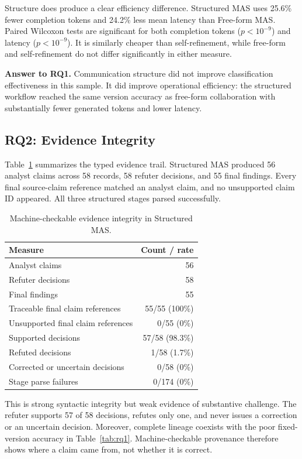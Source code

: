 Structure does produce a clear efficiency difference. Structured MAS uses 25.6\% fewer completion tokens and 24.2\% less mean latency than Free-form MAS. Paired Wilcoxon tests are significant for both completion tokens ($p<10^{-9}$) and latency ($p<10^{-9}$). It is similarly cheaper than self-refinement, while free-form and self-refinement do not differ significantly in either measure.

\noindent\textbf{Answer to RQ1.} Communication structure did not improve classification effectiveness in this sample. It did improve operational efficiency: the structured workflow reached the same version accuracy as free-form collaboration with substantially fewer generated tokens and lower latency.

\subsection{RQ2: Evidence Integrity}

Table~\ref{tab:rq2} summarizes the typed evidence trail. Structured MAS produced 56 analyst claims across 58 records, 58 refuter decisions, and 55 final findings. Every final source-claim reference matched an analyst claim, and no unsupported claim ID appeared. All three structured stages parsed successfully.

\begin{table}[t]
\centering
\caption{Machine-checkable evidence integrity in Structured MAS.}
\label{tab:rq2}
\setlength{\tabcolsep}{4pt}
\begin{tabular}{lr}
\toprule
Measure & Count / rate \\
\midrule
Analyst claims & 56 \\
Refuter decisions & 58 \\
Final findings & 55 \\
Traceable final claim references & 55/55 (100\%) \\
Unsupported final claim references & 0/55 (0\%) \\
Supported decisions & 57/58 (98.3\%) \\
Refuted decisions & 1/58 (1.7\%) \\
Corrected or uncertain decisions & 0/58 (0\%) \\
Stage parse failures & 0/174 (0\%) \\
\bottomrule
\end{tabular}
\end{table}

This is strong syntactic integrity but weak evidence of substantive challenge. The refuter supports 57 of 58 decisions, refutes only one, and never issues a correction or an uncertain decision. Moreover, complete lineage coexists with the poor fixed-version accuracy in Table~\ref{tab:rq1}. Machine-checkable provenance therefore shows where a claim came from, not whether it is correct.

